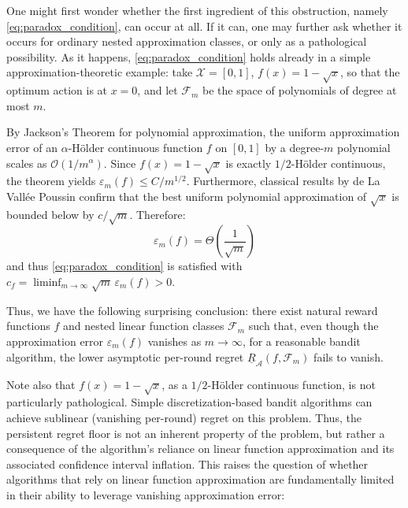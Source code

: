 \documentclass{article}
\numberwithin{theorem}{section}
\theoremstyle{definition}
\newcommand{\Fs}{\mathcal F}
\newcommand{\Os}{\mathcal O}
\newcommand{\Xs}{\mathcal X}
\begin{document}
One might first wonder whether the first ingredient of this obstruction, namely \cref{eq:paradox_condition}, can occur at all.
If it can, one may further ask whether it occurs for ordinary nested approximation classes, or only as a pathological possibility.
As it happens, \cref{eq:paradox_condition} holds already in a simple approximation-theoretic example: take $\Xs=[0,1]$, $f(x) = 1-\sqrt{x}$, so that the optimum action is at $x=0$, and let $\Fs_m$ be the space of polynomials of degree at most $m$.

By Jackson's Theorem for polynomial approximation, the uniform approximation error of an $\alpha$-Hölder continuous function $f$ on $[0,1]$ by a degree-$m$ polynomial scales as $\Os(1/m^\alpha)$.
Since $f(x) = 1 - \sqrt{x}$ is exactly $1/2$-Hölder continuous, the theorem yields $\varepsilon_m(f) \le C/m^{1/2}$. Furthermore, classical results by de La Vallée Poussin confirm that the best uniform polynomial approximation of $\sqrt{x}$ is bounded below by $c/\sqrt{m}$. Therefore:
\[
\varepsilon_m(f) = \Theta\left(\frac{1}{\sqrt{m}}\right)
\]
and thus \cref{eq:paradox_condition} is satisfied with $c_f = \liminf_{m\to\infty} \sqrt{m}\,\varepsilon_m(f) > 0$.

Thus, we have the following surprising conclusion: 
there exist natural reward functions $f$ and nested linear function classes $\Fs_m$ such that,
even though the approximation error $\varepsilon_m(f)$ vanishes as $m \to \infty$, for a reasonable bandit algorithm, the lower asymptotic per-round regret $\underline R_{\mathscr A}(f,\Fs_m)$ fails to vanish.


Note also that $f(x)=1-\sqrt{x}$, as a $1/2$-Hölder continuous function, is not particularly pathological.
Simple discretization-based bandit algorithms can achieve sublinear (vanishing per-round) regret on this problem.
Thus, the persistent regret floor is not an inherent property of the problem, but rather a consequence of the algorithm's reliance on linear function approximation and its associated confidence interval inflation.
This raises the question of whether algorithms that rely on linear function approximation are fundamentally limited in their ability to leverage vanishing approximation error:
\end{document}
